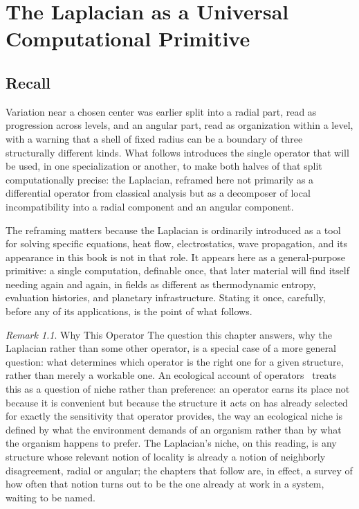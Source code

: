 \documentclass[11pt,fleqn]{book}
\numberwithin{equation}{chapter}
\theoremstyle{plain}
\theoremstyle{definition}
\theoremstyle{remark}
\newtheorem{remark}[theorem]{Remark}
\begin{document}
\chapter{The Laplacian as a Universal Computational Primitive}

\section{Recall}

Variation near a chosen center was earlier split into a radial part, read as progression across levels, and an angular part, read as organization within a level, with a warning that a shell of fixed radius can be a boundary of three structurally different kinds. What follows introduces the single operator that will be used, in one specialization or another, to make both halves of that split computationally precise: the Laplacian, reframed here not primarily as a differential operator from classical analysis but as a decomposer of local incompatibility into a radial component and an angular component.

The reframing matters because the Laplacian is ordinarily introduced as a tool for solving specific equations, heat flow, electrostatics, wave propagation, and its appearance in this book is not in that role. It appears here as a general-purpose primitive: a single computation, definable once, that later material will find itself needing again and again, in fields as different as thermodynamic entropy, evaluation histories, and planetary infrastructure. Stating it once, carefully, before any of its applications, is the point of what follows.

\begin{remark}{Why This Operator}
The question this chapter answers, why the Laplacian rather than some other operator, is a special case of a more general question: what determines which operator is the right one for a given structure, rather than merely a workable one. An ecological account of operators~\cite{operator-ecology} treats this as a question of niche rather than preference: an operator earns its place not because it is convenient but because the structure it acts on has already selected for exactly the sensitivity that operator provides, the way an ecological niche is defined by what the environment demands of an organism rather than by what the organism happens to prefer. The Laplacian's niche, on this reading, is any structure whose relevant notion of locality is already a notion of neighborly disagreement, radial or angular; the chapters that follow are, in effect, a survey of how often that notion turns out to be the one already at work in a system, waiting to be named.
\end{remark}
\end{document}
